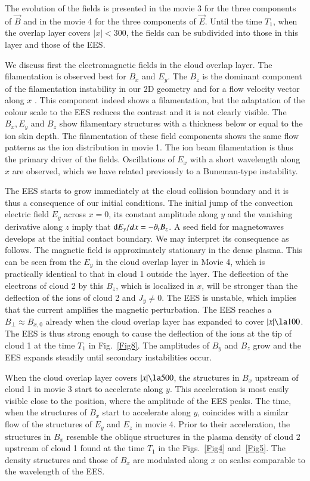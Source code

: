 \documentclass[structabstract]{aa}
\begin{document}
The evolution of the fields is presented in the movie 3 for the three 
components of $\vec{B}$ and in the movie 4 for the three components of 
$\vec{E}$. Until the time $T_1$, when the overlap layer covers $|x|<300$, 
the fields can be subdivided into those in this layer and those of the EES. 

We discuss first the electromagnetic fields in the cloud overlap layer. 
The filamentation is observed best for $B_x$ and $E_y$. The $B_z$ is the
dominant component of the filamentation instability in our 2D geometry
and for a flow velocity vector along $x$ \citep{Bret,Sch1}. This component
indeed shows a filamentation, but the adaptation of the colour scale to 
the EES reduces the contrast and it is not clearly visible. The $B_x,E_y$
and $B_z$ show filamentary structures with a thickness below or equal to 
the ion skin depth. The filamentation of these field components shows 
the same flow patterns as the ion distribution in movie 1. The ion beam
filamentation is thus the primary driver of the fields. Oscillations of 
$E_x$ with a short wavelength along $x$ are observed, which we have related 
previously to a Buneman-type instability. 

The EES starts to grow immediately at the cloud collision boundary and 
it is thus a consequence of our initial conditions. The initial jump of 
the convection electric field $E_y$ across $x=0$, its constant amplitude 
along $y$ and the vanishing derivative along $z$ imply that ${\rm d} E_y 
/ dx = -\partial_t B_z$. A seed field for magnetowaves develops at the 
initial contact boundary. We may interpret its consequence as follows. 
The magnetic field is approximately stationary in the dense plasma. This
can be seen from the $E_y$ in the cloud overlap layer in Movie 4, which
is practically identical to that in cloud 1 outside the layer. The 
deflection of the electrons of cloud 2 by this $B_z$, which is localized 
in $x$, will be stronger than the deflection of the ions of cloud 2 and 
$J_y \neq 0$. The EES is unstable, which implies that the current amplifies 
the magnetic perturbation. The EES reaches a $B_\perp \approx B_{x,0}$ 
already when the cloud overlap layer has expanded to cover $|x|\la 100$. 
The EES is thus strong enough to cause the deflection of the ions at the 
tip of cloud 1 at the time $T_1$ in Fig.~\ref{Fig8}. The amplitudes of 
$B_y$ and 
$B_z$ grow and the EES expands steadily until secondary instabilities 
occur. 

When the cloud overlap layer covers $|x| \la 500$, the structures in $B_x$ 
upstream of cloud 1 in movie 3 start to accelerate along $y$. This 
acceleration is most easily visible close to the position, where the 
amplitude of the EES peaks. The 
time, when the structures of $B_x$ start to accelerate along $y$, coincides 
with a similar flow of the structures of $E_y$ and $E_z$ in movie 4. Prior to 
their acceleration, the structures in $B_x$ resemble the oblique structures 
in the plasma density of cloud 2 upstream of cloud 1 found at the time $T_1$ 
in the Figs.~\ref{Fig4} and~\ref{Fig5}. The density structures and those of 
$B_x$ are modulated along $x$ on scales comparable to the wavelength of the EES.
\end{document}

